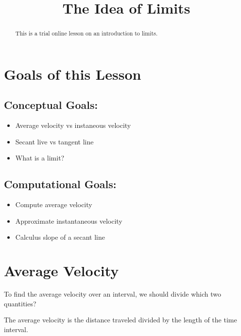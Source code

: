 \documentclass{ximera}
\title{The Idea of Limits}
\begin{document}
\begin{abstract}
This is a trial online lesson on an introduction to limits.
\end{abstract}
\maketitle

\section{Goals of this Lesson}
\subsection{Conceptual Goals:}

\begin{itemize}
\item Average velocity vs instaneous velocity
\item Secant live vs tangent line
\item What is a limit?
\end{itemize}

\subsection{Computational Goals:}

\begin{itemize}
\item Compute average velocity
\item Approximate instantaneous velocity
\item Calculus slope of a secant line
\end{itemize}


\section{Average Velocity}


\begin{question}
  To find the average velocity over an interval, we should divide which two quantities?
  \begin{selectAll}
  \end{selectAll}
  \begin{feedback}
  The average velocity is the distance traveled divided by the length of the time interval.
  \end{feedback}
\end{question}
\end{document}
